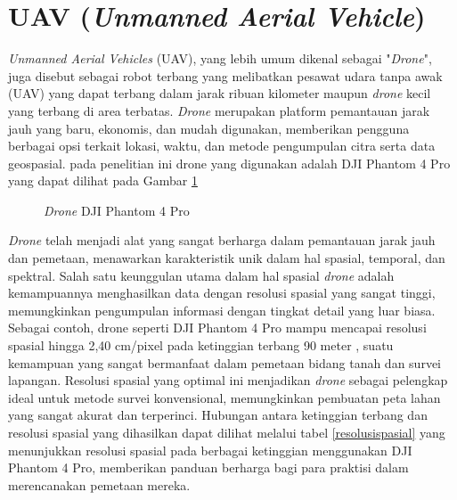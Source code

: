 \section{UAV (\textit{Unmanned Aerial Vehicle})}

\par \textit{Unmanned Aerial Vehicles} (UAV), yang lebih umum dikenal sebagai "\textit{Drone}", 
juga disebut sebagai robot terbang yang melibatkan pesawat udara tanpa awak (UAV) 
yang dapat terbang dalam jarak ribuan kilometer maupun \textit{drone} kecil yang terbang di
area terbatas. \textit{Drone} merupakan platform pemantauan jarak jauh yang baru, ekonomis, 
dan mudah digunakan, memberikan pengguna berbagai opsi terkait lokasi, waktu, dan 
metode pengumpulan citra serta data geospasial. pada penelitian ini drone yang digunakan adalah DJI Phantom 4 Pro yang dapat dilihat pada Gambar \ref{gambardrone}

\begin{figure}[H]
\centering
{}
\caption{\textit{Drone} DJI Phantom 4 Pro}
\label{gambardrone}
\end{figure}

\par \textit{Drone} telah menjadi alat yang sangat berharga dalam pemantauan jarak jauh dan pemetaan, menawarkan karakteristik unik dalam hal spasial, temporal, dan spektral. Salah satu keunggulan utama dalam hal spasial \textit{drone} adalah kemampuannya menghasilkan data dengan resolusi spasial yang sangat tinggi, memungkinkan pengumpulan informasi dengan tingkat detail yang luar biasa. Sebagai contoh, drone seperti DJI Phantom 4 Pro mampu mencapai resolusi spasial hingga 2,40 cm/pixel pada ketinggian terbang 90 meter \citep{hernina2019analisis}, suatu kemampuan yang sangat bermanfaat dalam pemetaan bidang tanah dan survei lapangan. Resolusi spasial yang optimal ini menjadikan \textit{drone} sebagai pelengkap ideal untuk metode survei konvensional, memungkinkan pembuatan peta lahan yang sangat akurat dan terperinci. Hubungan antara ketinggian terbang dan resolusi spasial yang dihasilkan dapat dilihat melalui tabel \ref{resolusispasial} yang menunjukkan resolusi spasial pada berbagai ketinggian menggunakan DJI Phantom 4 Pro, memberikan panduan berharga bagi para praktisi dalam merencanakan pemetaan mereka.

